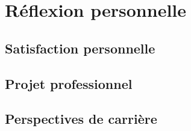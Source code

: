 
\section{Réflexion personnelle}


\subsection{Satisfaction personnelle}


\subsection{Projet professionnel}


\subsection{Perspectives de carrière}

